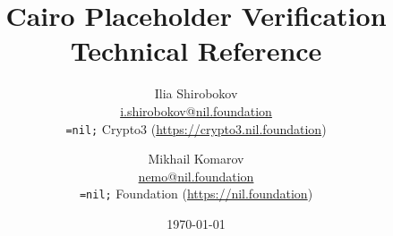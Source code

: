 \setlength{\droptitle}{-4\baselineskip} %

\pretitle{\begin{center}\Huge\bfseries} %
\title{Cairo Placeholder Verification \\[1ex] \large Technical Reference} %
\posttitle{\end{center}} %
\author{ %
	\protect\begin{tabular}{c} \normalsize Ilia Shirobokov \\
	    \normalsize \href{mailto:i.shirobokov@nil.foundation}{i.shirobokov@nil.foundation} \\
	    \normalsize \texttt{=nil;} Crypto3 (\url{https://crypto3.nil.foundation})\\ 
	\protect\end{tabular}
    \and
    \protect\begin{tabular}{c} \normalsize Mikhail Komarov \\
	    \normalsize \href{mailto:nemo@nil.foundation}{nemo@nil.foundation} \\
	    \normalsize \texttt{=nil;} Foundation (\url{https://nil.foundation})\\ 
	\protect\end{tabular}
}
\date{\today} %
